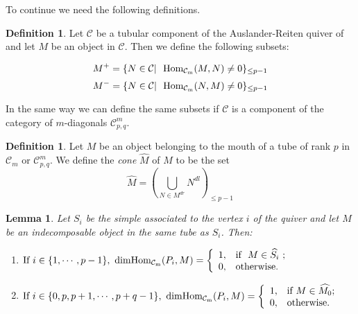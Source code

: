 \documentclass{amsart}
\theoremstyle{plain}
\newtheorem{lema}[teo]{Lemma}
\theoremstyle{definition}
\newtheorem{defi}[teo]{Definition}
\begin{document}
To continue we need the following definitions.\\

\begin{defi}
Let  $\mathcal{C}$ be a tubular component of the  Auslander-Reiten quiver of  ${\mathop{\mathcal{C}_m}\nolimits}$ and let   $M$ be an object in   $\mathcal{C}$. Then we define the following subsets:

$$M^+=\{N\in \mathcal{C} | \ \  {\mathop{\rm Hom_{\mathcal{C}_m}}\nolimits}(M,N)\neq
0 \}_{\leq p-1}$$
$$M^-=\{N\in \mathcal{C} | \ \ {\mathop{\rm Hom_{\mathcal{C}_m}}\nolimits}(N,M)\neq
0 \}_{\leq p-1}$$
\end{defi}

In the same way we can define the same subsets if
$\mathcal{C}$ is a component  of the category of  $m$-diagonals $\mathcal{C}^m_{p,q}$.\\

\begin{defi}
Let  $M$ be an  object belonging to the mouth of a  tube  of rank $p$ in $\mathcal{C}_m$ or $\mathcal{C}^m_{p,q}$. We define  the \emph{cone} $\widehat{M}$  of $M$ to be the set  $$\widehat{M}=\left (\bigcup_{N\in M^{dr}}N^{dl}\right )_{\leq p-1} $$
\end{defi}

\begin{lema}\label{M^}Let $S_i$ be the simple associated to the vertex $i$ of the quiver and  let $M$ be an indecomposable  object   in the same  tube as  $S_i$. Then:
\begin{enumerate}
  \item $\text{If  } i\in \{1,\cdots, p-1 \},  \text{  } {\mathop{\rm dim}\nolimits} {\mathop{\rm Hom_{\mathcal{C}_m}}\nolimits}(P_i,M)=\left\{
              \begin{array}{ll}
                1, & \hbox{\text{if }  $M\in \widehat{S_i}$ ;} \\
                0, & \hbox{\text{otherwise}.}
              \end{array}
            \right.$
  \item $\text{If  } i\in\{0,p, p+1,\cdots, p+q-1\},  \text{   }{\mathop{\rm dim}\nolimits} {\mathop{\rm Hom_{\mathcal{C}_m}}\nolimits}(P_i,M)=\left\{\begin{array}{ll}
                                                             1, & \hbox{\text{if  }$M\in \widehat{M_0}$;} \\
                                                             0, & \hbox{otherwise.}
                                                           \end{array}
                                                         \right.$
\end{enumerate}

\end{lema}
\end{document}
